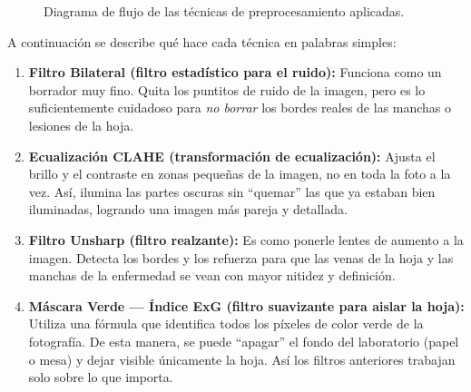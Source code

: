 \documentclass[11pt,a4paper]{article}
\begin{document}
\begin{figure}[H]
    \centering
    \caption{Diagrama de flujo de las técnicas de preprocesamiento aplicadas.}
    \label{fig:flowchart}
\end{figure}

A continuación se describe qué hace cada técnica en palabras simples:

\begin{enumerate}
    \item \textbf{Filtro Bilateral (filtro estadístico para el ruido):} Funciona como un borrador
    muy fino. Quita los puntitos de ruido de la imagen, pero es lo suficientemente cuidadoso para
    \textit{no borrar} los bordes reales de las manchas o lesiones de la hoja.

    \item \textbf{Ecualización CLAHE (transformación de ecualización):} Ajusta el brillo y el
    contraste en zonas pequeñas de la imagen, no en toda la foto a la vez. Así, ilumina las
    partes oscuras sin ``quemar'' las que ya estaban bien iluminadas, logrando una imagen
    más pareja y detallada.

    \item \textbf{Filtro Unsharp (filtro realzante):} Es como ponerle lentes de aumento a la
    imagen. Detecta los bordes y los refuerza para que las venas de la hoja y las manchas
    de la enfermedad se vean con mayor nitidez y definición.

    \item \textbf{Máscara Verde --- Índice ExG (filtro suavizante para aislar la hoja):}
    Utiliza una fórmula que identifica todos los píxeles de color verde de la fotografía.
    De esta manera, se puede ``apagar'' el fondo del laboratorio (papel o mesa) y dejar
    visible únicamente la hoja. Así los filtros anteriores trabajan solo sobre lo que importa.
\end{enumerate}
\end{document}
